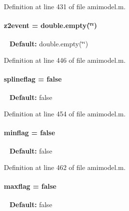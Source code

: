 Definition at line 431 of file amimodel.\+m.

\hypertarget{classamimodel_a7a7be015feeb7a346dceccd49e622b4b}{}
\paragraph[{z2event}]{\setlength{\rightskip}{0pt plus 5cm}z2event = double.\+empty(\char`\"{}\char`\"{})}\label{classamimodel_a7a7be015feeb7a346dceccd49e622b4b}
~\newline
{\bfseries Default\+:} double.\+empty(\char`\"{}\char`\"{}) 

Definition at line 446 of file amimodel.\+m.

\hypertarget{classamimodel_abea45d67286ebbf35dcbc12e335ffd51}{}
\paragraph[{splineflag}]{\setlength{\rightskip}{0pt plus 5cm}splineflag = false}\label{classamimodel_abea45d67286ebbf35dcbc12e335ffd51}
~\newline
{\bfseries Default\+:} false 

Definition at line 454 of file amimodel.\+m.

\hypertarget{classamimodel_affead4b7a87bc135fea91fd5aada78a8}{}
\paragraph[{minflag}]{\setlength{\rightskip}{0pt plus 5cm}minflag = false}\label{classamimodel_affead4b7a87bc135fea91fd5aada78a8}
~\newline
{\bfseries Default\+:} false 

Definition at line 462 of file amimodel.\+m.

\hypertarget{classamimodel_a1a65e7157ae2262cfa11a783b018364f}{}
\paragraph[{maxflag}]{\setlength{\rightskip}{0pt plus 5cm}maxflag = false}\label{classamimodel_a1a65e7157ae2262cfa11a783b018364f}
~\newline
{\bfseries Default\+:} false 

